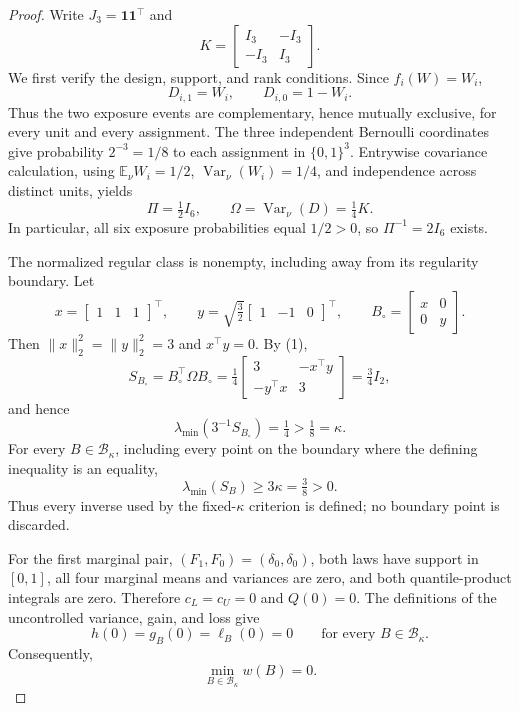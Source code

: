 \documentclass{article}
\begin{document}
\begin{proof}
Write \(J_3=\mathbf 1\mathbf 1^{\top}\) and
\[
K=\begin{bmatrix}I_3&-I_3\\-I_3&I_3\end{bmatrix}.
\]
We first verify the design, support, and rank conditions.  Since \(f_i(W)=W_i\),
\[
D_{i,1}=W_i,
\qquad
D_{i,0}=1-W_i.
\]
Thus the two exposure events are complementary, hence mutually exclusive, for every unit and every assignment.  The three independent Bernoulli coordinates give probability \(2^{-3}=1/8\) to each assignment in \(\{0,1\}^3\).  Entrywise covariance calculation, using \(\mathbb E_\nu W_i=1/2\), \(\operatorname{Var}_\nu(W_i)=1/4\), and independence across distinct units, yields
\[
\Pi=\tfrac12 I_6,
\qquad
\Omega=\operatorname{Var}_\nu(D)=\tfrac14K.
\tag{1}
\]
In particular, all six exposure probabilities equal \(1/2>0\), so \(\Pi^{-1}=2I_6\) exists.

The normalized regular class is nonempty, including away from its regularity boundary.  Let
\[
x=\begin{bmatrix}1&1&1\end{bmatrix}^{\top},
\qquad
y=\sqrt{\tfrac32}\begin{bmatrix}1&-1&0\end{bmatrix}^{\top},
\qquad
B_\circ=\begin{bmatrix}x&0\\0&y\end{bmatrix}.
\]
Then \(\lVert x\rVert_2^2=\lVert y\rVert_2^2=3\) and \(x^{\top}y=0\).  By (1),
\[
S_{B_\circ}=B_\circ^{\top}\Omega B_\circ
=\tfrac14\begin{bmatrix}3&-x^{\top}y\\-y^{\top}x&3\end{bmatrix}
=\tfrac34 I_2,
\]
and hence
\[
\lambda_{\min}(3^{-1}S_{B_\circ})=\tfrac14>\tfrac18=\kappa.
\tag{2}
\]
For every \(B\in\mathcal B_\kappa\), including every point on the boundary where the defining inequality is an equality,
\[
\lambda_{\min}(S_B)\ge 3\kappa=\tfrac38>0.
\tag{3}
\]
Thus every inverse used by the fixed-\(\kappa\) criterion is defined; no boundary point is discarded.

For the first marginal pair, \((F_1,F_0)=(\delta_0,\delta_0)\), both laws have support in \([0,1]\), all four marginal means and variances are zero, and both quantile-product integrals are zero.  Therefore \(c_L=c_U=0\) and \(Q(0)=0\).  The definitions of the uncontrolled variance, gain, and loss give
\[
h(0)=g_B(0)=\ell_B(0)=0
\qquad\text{for every }B\in\mathcal B_\kappa.
\]
Consequently,
\[
\min_{B\in\mathcal B_\kappa}w(B)=0.
\tag{4}
\]


\end{proof}
\end{document}
